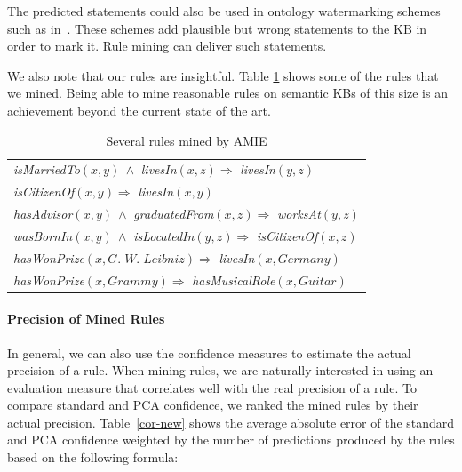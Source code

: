 The predicted statements could also be used in ontology watermarking schemes such as in~\cite{DBLP:conf/www/SuchanekG12}. These schemes add plausible but wrong statements to the KB in order to mark it. Rule mining can deliver such statements.

We also note that our rules are insightful. Table \ref{rules} shows some of the rules that we mined.
Being able to mine reasonable rules on semantic KBs of this size is an achievement beyond the current state of the art.


\begin{table}
\hspace*{-3.4ex}
\begin{tabular}{|l|}
\hline
\emph{isMarriedTo}$(x,y)\ \wedge$ \emph{livesIn}$(x,z) \Rightarrow $ \emph{livesIn}$(y,z)$\\
\emph{isCitizenOf}$(x,y) \Rightarrow$ \emph{livesIn}$(x,y)$\\
\emph{hasAdvisor}$(x,y)\ \wedge $ \emph{graduatedFrom}$(x,z) \Rightarrow$ \emph{worksAt}$(y,z)$\\
\emph{wasBornIn}$(x,y)\ \wedge$ \emph{isLocatedIn}$(y,z) \Rightarrow$ \emph{isCitizenOf}$(x,z)$\\
\emph{hasWonPrize}$(x,G.\;W.\;Leibniz) \Rightarrow$ \emph{livesIn}$(x,Germany)$\\
\emph{hasWonPrize}$(x,Grammy) \Rightarrow$ \emph{hasMusicalRole}$(x,Guitar)$\\
\hline
\end{tabular}
\caption{Several rules mined by AMIE}
\label{rules}
\end{table}

\paragraph{Precision of Mined Rules}
In general, we can also use the confidence measures to estimate the actual precision of a rule.
When mining rules, we are naturally interested in using an evaluation measure that correlates well with the real precision of a rule.
To compare standard and PCA confidence, we ranked the mined rules by their actual precision.
Table~\ref{cor-new} shows the average absolute error of the standard and PCA confidence weighted by the number of predictions produced by the rules based on the following formula:

